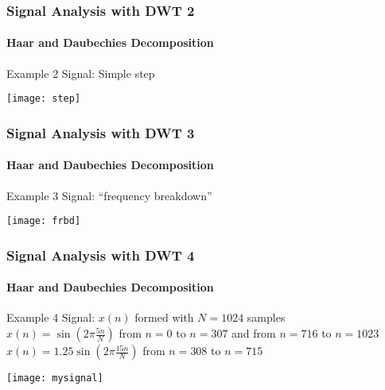 \documentclass[9pt]{beamer}
\begin{document}
\begin{frame}
\frametitle{Signal Analysis with DWT \hfill{2}}
\framesubtitle{Haar and Daubechies Decomposition}

\begin{block}{Example 2} 
{\scriptsize Signal: Simple step}
\end{block}
\begin{center}
\texttt{[image: step]}
\end{center}
\end{frame}

\begin{frame}
\frametitle{Signal Analysis with DWT \hfill{3}}
\framesubtitle{Haar and Daubechies Decomposition}

\begin{block}{Example 3} 
{\scriptsize Signal: ``frequency breakdown''}
\end{block}
\begin{center}
\texttt{[image: frbd]}
\end{center}

\end{frame}

\begin{frame}
\frametitle{Signal Analysis with DWT \hfill{4}}
\framesubtitle{Haar and Daubechies Decomposition}

\begin{block}{Example 4}
{\scriptsize
    Signal: $x(n)$ formed with $N=1024$ samples \\
    $x(n)=\sin(2\pi\frac{5n}{N})$ from $n=0$ to $n=307$ and from $n=716$ to $n=1023$ \\
    $x(n)=1.25\sin(2\pi\frac{15n}{N})$ from $n=308$ to $n=715$
}
\end{block}

\begin{center}
\texttt{[image: mysignal]}
\end{center}
\end{frame}
\end{document}
